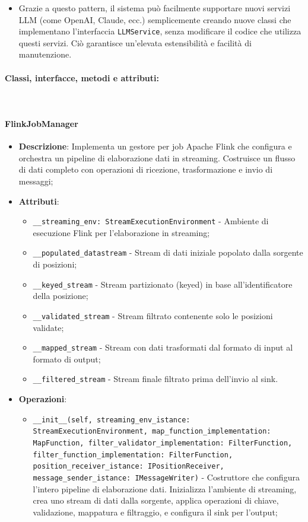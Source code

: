 \documentclass[10pt]{article}
\newcommand{\myparagraph}[1]{\paragraph{#1}\mbox{}\\}
\begin{document}
\begin{itemize}
\begin{itemize}
        \item Grazie a questo pattern, il sistema può facilmente supportare nuovi servizi LLM (come OpenAI, Claude, ecc.) semplicemente creando nuove classi che implementano l'interfaccia \texttt{LLMService}, senza modificare il codice che utilizza questi servizi. Ciò garantisce un'elevata estensibilità e facilità di manutenzione.
    \end{itemize}
    \end{itemize}


    \myparagraph{Classi, interfacce, metodi e attributi:}

    \paragraph{FlinkJobManager}
    \begin{itemize} 
    \item \textbf{Descrizione}: Implementa un gestore per job Apache Flink che configura e orchestra un pipeline di elaborazione dati in streaming. Costruisce un flusso di dati completo con operazioni di ricezione, trasformazione e invio di messaggi;
    \item \textbf{Attributi}:
    \begin{itemize}
        \item \texttt{\_\_streaming\_env: StreamExecutionEnvironment} - Ambiente di esecuzione Flink per l'elaborazione in streaming;
        \item \texttt{\_\_populated\_datastream} - Stream di dati iniziale popolato dalla sorgente di posizioni;
        \item \texttt{\_\_keyed\_stream} - Stream partizionato (keyed) in base all'identificatore della posizione;
        \item \texttt{\_\_validated\_stream} - Stream filtrato contenente solo le posizioni validate;
        \item \texttt{\_\_mapped\_stream} - Stream con dati trasformati dal formato di input al formato di output;
        \item \texttt{\_\_filtered\_stream} - Stream finale filtrato prima dell'invio al sink.
    \end{itemize}
    
    \item \textbf{Operazioni}:
    \begin{itemize}
        \item \texttt{\_\_init\_\_(self, streaming\_env\_istance: StreamExecutionEnvironment, map\_function\_implementation: MapFunction, filter\_validator\_implementation: FilterFunction, filter\_function\_implementation: FilterFunction, position\_receiver\_istance: IPositionReceiver, message\_sender\_istance: IMessageWriter)} - Costruttore che configura l'intero pipeline di elaborazione dati. Inizializza l'ambiente di streaming, crea uno stream di dati dalla sorgente, applica operazioni di chiave, validazione, mappatura e filtraggio, e configura il sink per l'output;
        

\end{itemize}
\end{itemize}
\end{document}
